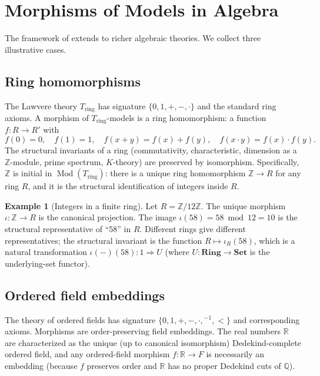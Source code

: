 \documentclass[12pt]{article}
\theoremstyle{definition}
\newtheorem{example}[theorem]{Example}
\theoremstyle{remark}
\newcommand{\Set}{\mathbf{Set}}
\newcommand{\Ring}{\mathbf{Ring}}
\newcommand{\ZZ}{\mathbb{Z}}
\newcommand{\QQ}{\mathbb{Q}}
\newcommand{\RR}{\mathbb{R}}
\newcommand{\Mod}[1]{\operatorname{Mod}(#1)}
\begin{document}
\section{Morphisms of Models in Algebra}\label{sec:morphisms}

The framework of  extends to richer algebraic theories. We collect three illustrative cases.

\subsection{Ring homomorphisms}

The Lawvere theory $T_{\mathrm{ring}}$ has signature $\{0, 1, +, -, \cdot\}$ and the standard ring axioms. A morphism of $T_{\mathrm{ring}}$-models is a ring homomorphism: a function $f : R \to R'$ with
\[
  f(0) = 0, \quad f(1) = 1, \quad f(x + y) = f(x) + f(y), \quad f(x \cdot y) = f(x) \cdot f(y).
\]
The structural invariants of a ring (commutativity, characteristic, dimension as a $\mathbb{Z}$-module, prime spectrum, $K$-theory) are preserved by isomorphism. Specifically, $\ZZ$ is initial in $\Mod{T_{\mathrm{ring}}}$: there is a unique ring homomorphism $\ZZ \to R$ for any ring $R$, and it is the structural identification of integers inside $R$.

\begin{example}[Integers in a finite ring]
Let $R = \ZZ/12\ZZ$. The unique morphism $\iota : \ZZ \to R$ is the canonical projection. The image $\iota(58) = 58 \bmod 12 = 10$ is the structural representative of ``$58$'' in $R$. Different rings give different representatives; the structural invariant is the function $R \mapsto \iota_R(58)$, which is a natural transformation $\iota(-)(58) : 1 \Rightarrow U$ (where $U : \Ring \to \Set$ is the underlying-set functor).
\end{example}

\subsection{Ordered field embeddings}

The theory of ordered fields has signature $\{0, 1, +, -, \cdot, {}^{-1}, <\}$ and corresponding axioms. Morphisms are order-preserving field embeddings. The real numbers $\RR$ are characterized as the unique (up to canonical isomorphism) Dedekind-complete ordered field, and any ordered-field morphism $f : \RR \to F$ is necessarily an embedding (because $f$ preserves order and $\RR$ has no proper Dedekind cuts of $\QQ$).
\end{document}
